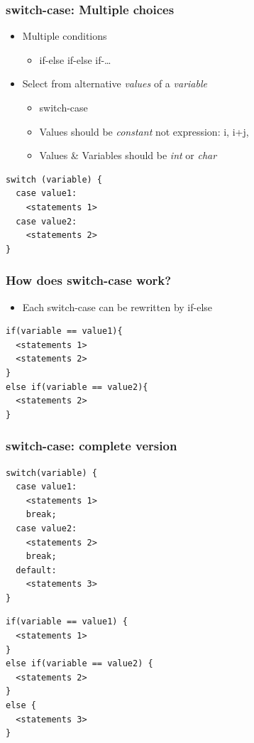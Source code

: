 \documentclass{../c-lecture}
\begin{document}
\begin{frame}[fragile]
  \frametitle{switch-case: Multiple choices}
  \begin{itemize}
    \item Multiple conditions
    \begin{itemize}
      \item if-else if-else if-\ldots
    \end{itemize}
    \item
      Select from alternative \textit{\color{Orange} values} of a
      \textit{\color{LimeGreen} variable}

    \begin{itemize}
      \item switch-case
      \item
        Values should be \textit{\color{Orange} constant} not expression:
        i, i+j,

      \item
        Values \& Variables should be \textit{\color{Orange} int} or
        \textit{\color{Orange} char}

    \end{itemize}
  \end{itemize}
  \begin{verbatim}
switch (variable) {
  case value1:
    <statements 1>
  case value2:
    <statements 2>
}
  \end{verbatim}
\end{frame}

\begin{frame}[fragile]
  \frametitle{How does switch-case work?}
  \begin{itemize}
    \item Each switch-case can be rewritten by if-else
  \end{itemize}
  \begin{verbatim}
if(variable == value1){
  <statements 1>
  <statements 2>
}
else if(variable == value2){
  <statements 2>
}
  \end{verbatim}
\end{frame}

\begin{frame}[fragile]
  \frametitle{switch-case: complete version}
  \scriptsize
  \begin{verbatim}
switch(variable) {
  case value1:
    <statements 1>
    break;
  case value2:
    <statements 2>
    break;
  default:
    <statements 3>
}
  \end{verbatim}
  \scriptsize
  \begin{verbatim}
if(variable == value1) {
  <statements 1>
}
else if(variable == value2) {
  <statements 2>
}
else {
  <statements 3>
}
  \end{verbatim}
\end{frame}
\end{document}

